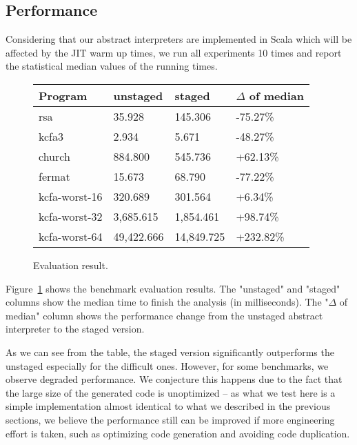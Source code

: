 \subsection{Performance}

Considering that our abstract interpreters are implemented in Scala which will be 
affected by the JIT warm up times, we run all experiments 10 times and report
the statistical median values of the running times.


\begin{figure}[h]
\begin{tabular}{@{}llll@{}}
\toprule
    Program            & unstaged   & staged     & $\Delta$ of median \\ \midrule
    rsa                & 35.928     & 145.306    & -75.27\%          \\
    kcfa3              & 2.934      & 5.671      & -48.27\%          \\
    church             & 884.800    & 545.736    & +62.13\%          \\
    fermat             & 15.673     & 68.790     & -77.22\%          \\
    kcfa-worst-16      & 320.689    & 301.564    & +6.34\%           \\
    kcfa-worst-32      & 3,685.615  & 1,854.461  & +98.74\%          \\
    kcfa-worst-64      & 49,422.666 & 14,849.725 & +232.82\%         \\
    \bottomrule
\end{tabular}
\caption{Evaluation result.} \label{evaluation_result}
\end{figure}

Figure~\ref{evaluation_result} shows the benchmark evaluation results. The
"unstaged" and "staged" columns show the median time to finish the analysis (in
milliseconds). The "$\Delta$ of median" column shows the performance change from
the unstaged abstract interpreter to the staged version.

As we can see from the table, the staged version significantly outperforms the
unstaged especially for the difficult ones. However, for some benchmarks, we
observe degraded performance. We conjecture this happens due to the fact that
the large size of the generated code is unoptimized -- as what we test here is a
simple implementation almost identical to what we described in the previous
sections, we believe the performance still can be improved if more engineering
effort is taken, such as optimizing code generation and avoiding code
duplication.

